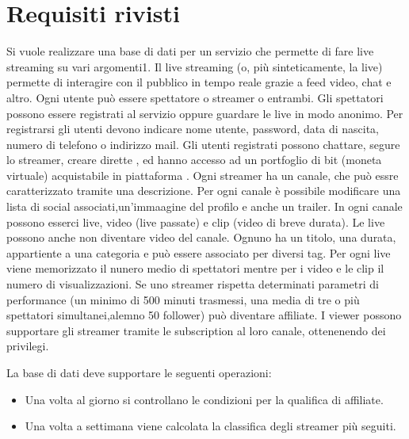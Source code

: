 \section{Requisiti rivisti}
Si vuole realizzare una base di dati per un servizio che permette di fare live streaming su vari
argomenti1. Il live streaming (o, più sinteticamente, la live) permette di interagire con il pubblico in
tempo reale grazie a feed video, chat e altro. \newline
Ogni utente può essere spettatore o streamer o entrambi. Gli spettatori possono essere registrati al servizio oppure guardare le live in modo anonimo. \newline
Per registrarsi gli utenti devono indicare nome utente, password, data di nascita, numero di telefono o indirizzo mail. \newline
Gli utenti registrati possono chattare, segure lo streamer, creare dirette , ed hanno accesso ad un portfoglio di bit (moneta virtuale) acquistabile in piattaforma . \newline
Ogni streamer ha un canale, che può essre caratterizzato tramite una descrizione. Per ogni canale è possibile modificare una lista di social associati,un'immaagine del profilo e anche un trailer. \newline
In ogni canale possono esserci live, video (live passate) e clip (video di breve durata). Le live possono anche non diventare video del canale. Ognuno ha un titolo, una durata, appartiente a una categoria e può essere associato per diversi tag. \newline
Per ogni live viene memorizzato il nunero medio di spettatori mentre per i video e le clip il numero di visualizzazioni. \newline
Se uno streamer rispetta determinati parametri di performance (un minimo di 500 minuti trasmessi, una media di tre o più spettatori simultanei,alemno 50 follower) può diventare affiliate. \newline
I viewer possono supportare gli streamer tramite le subscription al loro canale, ottenenendo dei privilegi. \newline

La base di dati deve supportare le seguenti operazioni:
\begin{itemize}
  \item  Una volta al giorno si controllano le condizioni per la qualifica di affiliate.
  \item  Una volta a settimana viene calcolata la classifica degli streamer più seguiti.
\end{itemize}

